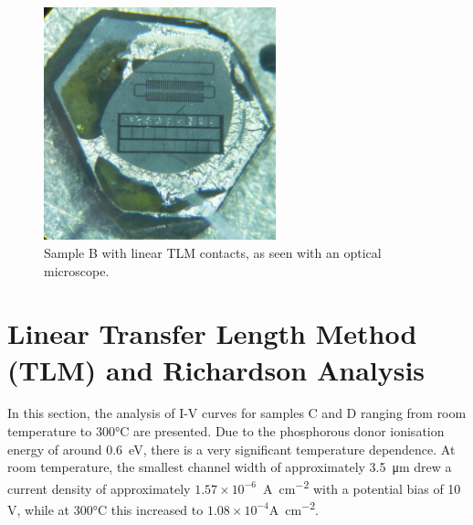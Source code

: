 \begin{refsection}
\begin{figure}[ht]
\centering
\includegraphics[width=0.6\textwidth]{Chapter3/Figs/Raster/Sample D 2019/TLMB.jpg}
\caption{Sample B with linear TLM contacts, as seen with an optical microscope.}
\label{fig:TLMB}
\end{figure}

\section{Linear Transfer Length Method (TLM) and Richardson Analysis}
In this section, the analysis of I-V curves for samples C and D ranging from room temperature to 300\si{\degreeCelsius} are presented. Due to the phosphorous donor ionisation energy of around 0.6~\si{\electronvolt}, there is a very significant temperature dependence. At room temperature, the smallest channel width of approximately 3.5~\si{\micro\metre} drew a current density of approximately $1.57\times10^{-6}$~\si{\ampere\per\centi\metre\squared} with a potential bias of 10 \si{\volt}, while at 300\si{\degreeCelsius} this increased to $1.08\times10^{-4}$\si{\ampere\per\centi\metre\squared}. 


\end{refsection}
